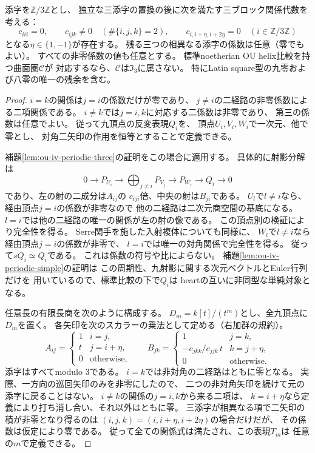 \begin{theorem}
\label{thm:ou-latin-square-periodic-exclusion}
添字を$\mathbb Z/3\mathbb Z$とし、
独立な三添字の置換の後に次を満たす三ブロック関係代数を考える：
\[
 c_{iii}=0,\qquad c_{ijk}\ne0\quad(\#\{i,j,k\}=2),
 \qquad c_{i,i+\eta,i+2\eta}=0\quad(i\in\mathbb Z/3\mathbb Z)
\]
となる$\eta\in\{1,-1\}$が存在する。
残る三つの相異なる添字の係数は任意（零でもよい）。
すべての非零係数の値も任意とする。
標準noetherian OU helix比較を持つ曲面圏$\mathcal C$が
対応するなら、$\mathcal C$は$\mathfrak I_3$に属さない。
特にLatin square型の九零および八零の唯一の残余を含む。
\end{theorem}
\begin{proof}
$i=k$の関係は$j=i$の係数だけが零であり、
$j\ne i$の二経路の非零係数による二項関係である。
$i\ne k$では$j=i,k$に対応する二係数は非零であり、
第三の係数は任意でよい。
従って九頂点の反変表現$Q_i$を、
頂点$U_i,V_i,W_i$で一次元、他で零とし、
対角二矢印の作用を恒等とすることで定義できる。

補題\ref{lem:ou-iv-periodic-three}の証明をこの場合に適用する。
具体的に射影分解は
\[
 0\longrightarrow P_{U_i}
 \longrightarrow \bigoplus_{j\ne i}P_{V_j}
 \longrightarrow P_{W_i}\longrightarrow Q_i\longrightarrow0
\]
であり、左の射の二成分は$A_{ij}$の
$c_{iji}$倍、中央の射は$B_{ji}$である。
$U_l$で$l\ne i$なら、経由頂点$j=i$の係数が非零なので
他の二経路は二次元商空間の基底になる。
$l=i$では他の二経路の唯一の関係が左の射の像である。
この頂点別の検証により完全性を得る。
Serre関手を施した入射複体についても同様に、
$W_l$で$l\ne i$なら経由頂点$j=i$の係数が非零で、
$l=i$では唯一の対角関係で完全性を得る。
従って$sQ_i\simeq Q_i$である。
これは係数の符号や比によらない。
補題\ref{lem:ou-iv-periodic-simple}の証明は
この周期性、九射影に関する次元ベクトルとEuler行列だけを
用いているので、標準比較の下で$Q_i$は
heartの互いに非同型な単純対象となる。

任意長の有限長商を次のように構成する。
$D_m=k[t]/(t^m)$とし、全九頂点に$D_m$を置く。
各矢印を次のスカラーの乗法として定める（右加群の規約）。
\[
 A_{ij}=
 \begin{cases}
 1&i=j,\\ t&j=i+\eta,\\0&\text{otherwise},
 \end{cases}
 \qquad
 B_{jk}=
 \begin{cases}
 1&j=k,\\
 -c_{jkk}/c_{jjk}\,t&k=j+\eta,\\
 0&\text{otherwise}.
 \end{cases}
\]
添字はすべてmodulo 3である。
$i=k$では非対角の二経路はともに零となる。
実際、一方向の巡回矢印のみを非零にしたので、
二つの非対角矢印を続けて元の添字に戻ることはない。
$i\ne k$の関係の$j=i,k$から来る二項は、
$k=i+\eta$なら定義により打ち消し合い、それ以外はともに零。
三添字が相異なる項で二矢印の積が非零となり得るのは
$(i,j,k)=(i,i+\eta,i+2\eta)$の場合だけだが、
その係数は仮定により零である。
従って全ての関係式は満たされ、この表現$T_m$は
任意の$m$で定義できる。


\end{proof}
